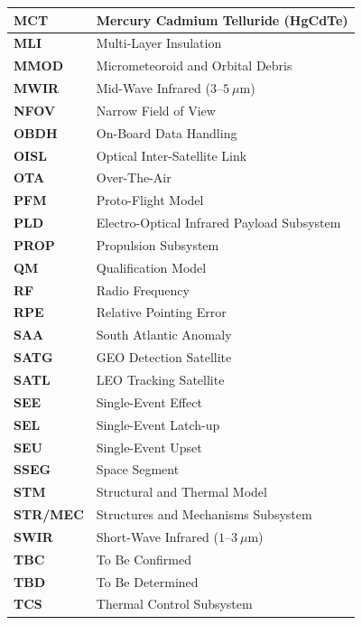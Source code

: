 {\begin{longtable}{|>{\raggedright\arraybackslash}p{3.0cm}|>{\raggedright\arraybackslash}p{12.4cm}|}
    \textbf{MCT}    & Mercury Cadmium Telluride (HgCdTe) \\ \hline
    \textbf{MLI}    & Multi-Layer Insulation \\ \hline
    \textbf{MMOD}   & Micrometeoroid and Orbital Debris \\ \hline
    \textbf{MWIR}   & Mid-Wave Infrared (\(3\text{--}5\ \mu\text{m}\)) \\ \hline
    \textbf{NFOV}   & Narrow Field of View \\ \hline
    \textbf{OBDH}   & On-Board Data Handling \\ \hline
    \textbf{OISL}   & Optical Inter-Satellite Link \\ \hline
    \textbf{OTA}    & Over-The-Air \\ \hline
    \textbf{PFM}    & Proto-Flight Model \\ \hline
    \textbf{PLD}    & Electro-Optical Infrared Payload Subsystem \\ \hline
    \textbf{PROP}   & Propulsion Subsystem \\ \hline
    \textbf{QM}     & Qualification Model \\ \hline
    \textbf{RF}     & Radio Frequency \\ \hline
    \textbf{RPE}    & Relative Pointing Error \\ \hline
    \textbf{SAA}    & South Atlantic Anomaly \\ \hline
    \textbf{SATG}   & GEO Detection Satellite \\ \hline
    \textbf{SATL}   & LEO Tracking Satellite \\ \hline
    \textbf{SEE}    & Single-Event Effect \\ \hline
    \textbf{SEL}    & Single-Event Latch-up \\ \hline
    \textbf{SEU}    & Single-Event Upset \\ \hline
    \textbf{SSEG}   & Space Segment \\ \hline
    \textbf{STM}    & Structural and Thermal Model \\ \hline
    \textbf{STR/MEC}& Structures and Mechanisms Subsystem \\ \hline
    \textbf{SWIR}   & Short-Wave Infrared (\(1\text{--}3\ \mu\text{m}\)) \\ \hline
    \textbf{TBC}    & To Be Confirmed \\ \hline
    \textbf{TBD}    & To Be Determined \\ \hline
    \textbf{TCS}    & Thermal Control Subsystem \\ \hline

\end{longtable}}
